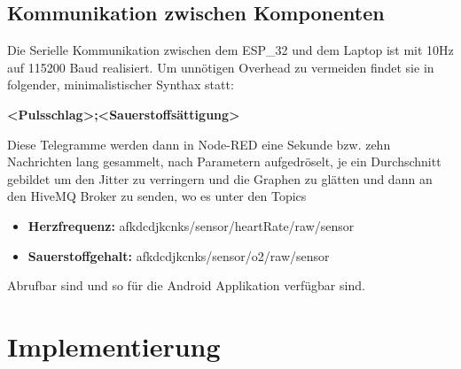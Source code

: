 \documentclass[12pt,oneside]{article}
\begin{document}
  \subsection{Kommunikation zwischen Komponenten}
	\label{subsec:internalCommunication}
	Die Serielle Kommunikation zwischen dem ESP\_32 und dem Laptop ist mit 10Hz auf 115200 Baud realisiert. Um unnötigen Overhead zu vermeiden findet sie in folgender, minimalistischer Synthax statt:\par
	\textbf{<Pulsschlag>;<Sauerstoffsättigung>}\par
	Diese Telegramme werden dann in Node-RED\cite{nodeRED} eine Sekunde bzw. zehn Nachrichten lang gesammelt, nach Parametern aufgedröselt, je ein Durchschnitt gebildet um den Jitter zu verringern und die Graphen zu glätten und dann an den HiveMQ Broker\cite{hiveMQ} zu senden, wo es unter den Topics
	\begin{itemize}
		\item \textbf{Herzfrequenz:} afkdcdjkcnks/sensor/heartRate/raw/sensor
		\item \textbf{Sauerstoffgehalt:} afkdcdjkcnks/sensor/o2/raw/sensor
	\end{itemize}
	Abrufbar sind und so für die Android Applikation verfügbar sind.
  
  
  
  
  
  \section{Implementierung}
  \label{sec:implementation}
  
\end{document}
